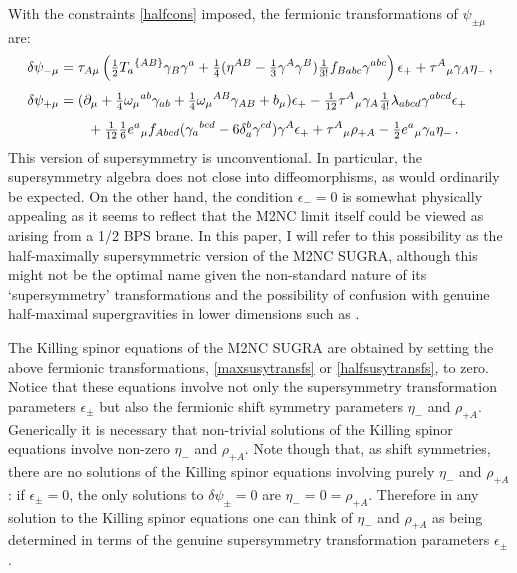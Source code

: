 \documentclass[11pt]{article}
\numberwithin{equation}{section}
\begin{document}
{{With the constraints \eqref{halfcons} imposed, the fermionic transformations of $\psi_{\pm \mu}$ are:
\begin{subequations}
\label{halfsusytransfs}
\begin{align}
 \delta \psi_{-\mu} & =  \tau_{A\mu} \left(
\tfrac12  T_{a}{}^{\{AB\}} \gamma_B \gamma^a
+\tfrac14 ( \eta^{AB} - \tfrac13 \gamma^A \gamma^B ) \tfrac{1}{3!} f_{Babc} \gamma^{abc} \right) \epsilon_+
+  \tau^A{}_\mu \gamma_A \eta_- 
\,,\\[4pt] \notag
\delta \psi_{+\mu} & = (\partial_\mu  + \tfrac{1}{4} \omega_\mu{}^{ab} \gamma_{ab}
+ \tfrac{1}{4}  \omega_\mu{}^{AB} \gamma_{AB} 	+  b_\mu )\epsilon_+
 - \tfrac{1}{12}  \tau^A{}_\mu \gamma_A  \tfrac{1}{4!} \lambda_{abcd} \gamma^{abcd} \epsilon_+
\\[4pt] &  \qquad  +\tfrac{1}{12} \tfrac{1}{6} e^a{}_\mu  f_{A bcd} ( \gamma_a{}^{bcd} - 6 \delta_a^b \gamma^{cd} ) \gamma^A \epsilon_+
 + \tau^A{}_\mu \rho_{+A}  - \tfrac12 e^a{}_\mu \gamma_a\eta_- 
 \,.
\end{align}
\end{subequations}
This version of supersymmetry is unconventional.
In particular, the supersymmetry algebra does not close into diffeomorphisms, as would ordinarily be expected.
On the other hand, the condition $\epsilon_- = 0$ is somewhat physically appealing as it seems to reflect that the M2NC limit itself could be viewed as arising from a 1/2 BPS brane.
In this paper, I will refer to this possibility as the half-maximally supersymmetric version of the M2NC SUGRA, although this might not be the optimal name given the non-standard nature of its `supersymmetry' transformations and the possibility of confusion with genuine half-maximal supergravities in lower dimensions such as \cite{Bergshoeff:2021tfn}.

\vspace{1em}
\noindent
The Killing spinor equations of the M2NC SUGRA are obtained by setting the above fermionic transformations, \eqref{maxsusytransfs} or \eqref{halfsusytransfs}, to zero.
Notice that these equations involve not only the supersymmetry transformation parameters $\epsilon_\pm$ but also the fermionic shift symmetry parameters $\eta_-$ and $\rho_{+A}$. 
Generically it is necessary that non-trivial solutions of the Killing spinor equations involve non-zero $\eta_-$ and $\rho_{+A}$.
Note though that, as shift symmetries, there are no solutions of the Killing spinor equations involving purely $\eta_-$ and $\rho_{+A}$: if $\epsilon_\pm = 0$, the only solutions to $\delta \psi_\pm = 0$ are $\eta_- = 0 = \rho_{+A}$. Therefore in any solution to the Killing spinor equations one can think of $\eta_-$ and $\rho_{+A}$ as being determined in terms of the genuine supersymmetry transformation parameters $\epsilon_\pm$.

}}
\end{document}
